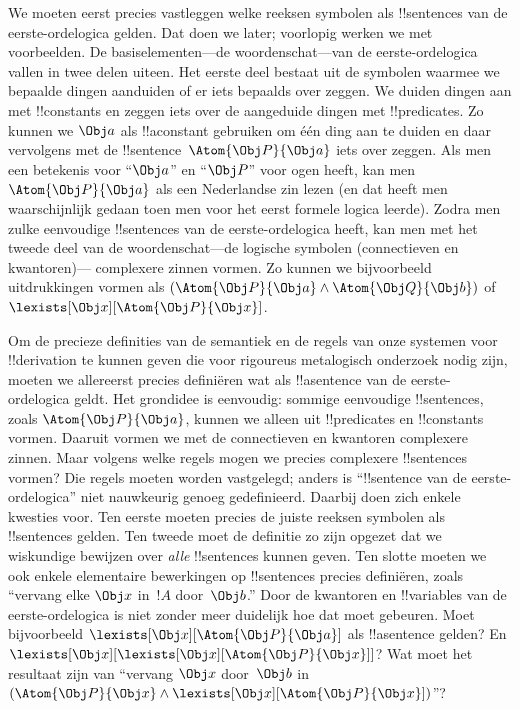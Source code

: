 \documentclass[../../../include/open-logic-section]{subfiles}
\begin{document}


We moeten eerst precies vastleggen welke reeksen symbolen als
!!{sentence}s van de eerste-ordelogica gelden. Dat doen we later;
voorlopig werken we met voorbeelden. De basiselementen---de
woordenschat---van de eerste-ordelogica vallen in twee delen uiteen.
Het eerste deel bestaat uit de symbolen waarmee we bepaalde dingen
aanduiden of er iets bepaalds over zeggen. We duiden dingen aan met
!!{constant}s en zeggen iets over de aangeduide dingen met
!!{predicate}s. Zo kunnen we $\Obj a$ als !!a{constant} gebruiken om
één ding aan te duiden en daar vervolgens met de
!!{sentence}~$\Atom{\Obj P}{\Obj a}$ iets over zeggen. Als men een
betekenis voor ``$\Obj a$'' en ``$\Obj P$'' voor ogen heeft, kan men
$\Atom{\Obj P}{\Obj a}$ als een Nederlandse zin lezen (en dat heeft
men waarschijnlijk gedaan toen men voor het eerst formele logica
leerde). Zodra men zulke eenvoudige !!{sentence}s van de
eerste-ordelogica heeft, kan men met het tweede deel van de
woordenschat---de logische symbolen (connectieven en kwantoren)---
complexere zinnen vormen. Zo kunnen we bijvoorbeeld uitdrukkingen
vormen als $(\Atom{\Obj P}{\Obj a} \land \Atom{\Obj Q}{\Obj b})$
of~$\lexists[\Obj x][\Atom{\Obj P}{\Obj x}]$.

Om de precieze definities van de semantiek en de regels van onze
systemen voor !!{derivation} te kunnen geven die voor rigoureus
metalogisch onderzoek nodig zijn, moeten we allereerst precies
definiëren wat als !!a{sentence} van de eerste-ordelogica geldt. Het
grondidee is eenvoudig: sommige eenvoudige !!{sentence}s, zoals
$\Atom{\Obj P}{\Obj a}$, kunnen we alleen uit !!{predicate}s en
!!{constant}s vormen. Daaruit vormen we met de connectieven en
kwantoren complexere zinnen. Maar volgens welke regels mogen we
precies complexere !!{sentence}s vormen? Die regels moeten worden
vastgelegd; anders is ``!!{sentence} van de eerste-ordelogica'' niet
nauwkeurig genoeg gedefinieerd. Daarbij doen zich enkele kwesties
voor. Ten eerste moeten precies de juiste reeksen symbolen als
!!{sentence}s gelden. Ten tweede moet de definitie zo zijn opgezet dat
we wiskundige bewijzen over \emph{alle} !!{sentence}s kunnen geven.
Ten slotte moeten we ook enkele elementaire bewerkingen op
!!{sentence}s precies definiëren, zoals ``vervang elke $\Obj x$ in~$!A$
door~$\Obj b$.'' Door de kwantoren en !!{variable}s van de
eerste-ordelogica is niet zonder meer duidelijk hoe dat moet gebeuren.
Moet bijvoorbeeld $\lexists[\Obj x][\Atom{\Obj P}{\Obj a}]$ als
!!a{sentence} gelden? En
$\lexists[\Obj x][\lexists[\Obj x][\Atom{\Obj P}{\Obj x}]]$? Wat moet
het resultaat zijn van ``vervang $\Obj x$ door~$\Obj b$ in
$(\Atom{\Obj P}{\Obj x} \land \lexists[\Obj x][\Atom{\Obj P}{\Obj
x}])$''?
\end{document}
